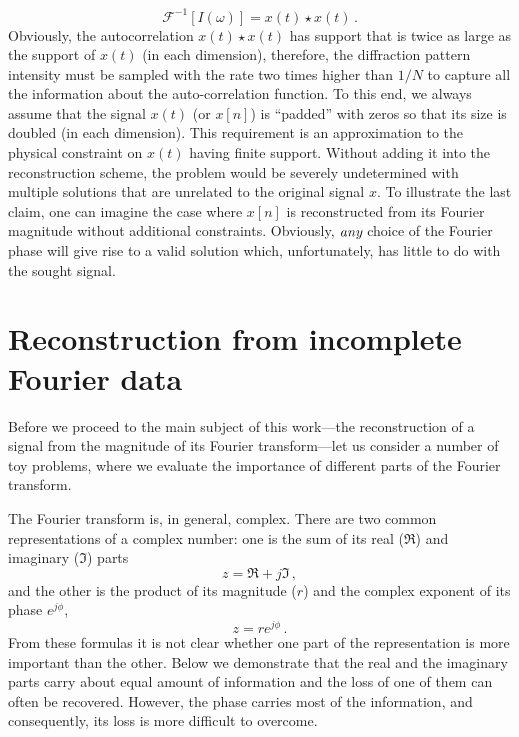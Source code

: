 \begin{equation}
  \label{eq:intro-2}
  \mathcal{F}^{-1}[I(\omega)] = x(t)\star x(t) \,. 
\end{equation}
Obviously, the autocorrelation $x(t)\star x(t)$ has support that is
twice as large as the support of $x(t)$ (in each dimension),
therefore, the diffraction pattern intensity must be sampled with the
rate two times higher than $1/N$ to capture all the information about
the auto-correlation function. To this end, we always assume that the
signal $x(t)$ (or $x[n]$) is ``padded'' with zeros so that its
size is doubled (in each dimension). This requirement is an
approximation to the physical constraint on $x(t)$ having finite
support. Without adding it into the reconstruction scheme, the problem
would be severely undetermined with multiple solutions that are
unrelated to the original signal $x$. To illustrate the last claim, one
can imagine the case where $x[n]$ is reconstructed from its Fourier
magnitude without additional constraints. Obviously, $\emph{any}$
choice of the Fourier phase will give rise to a valid solution which,
unfortunately,  has little to do  with the sought signal. 

\section{Reconstruction from incomplete Fourier data}
\label{sec:reconstr-from-incomp}
Before we proceed to the main subject of this work---the
reconstruction of a signal from the magnitude of its Fourier
transform---let us consider a number of toy problems, where we
evaluate the importance of different parts of the Fourier transform.

The Fourier transform is, in general, complex. There are two common
representations of a complex number: one is the sum of its real
($\Re$) and
imaginary ($\Im$) parts
\begin{equation}
  \label{eq:intro-3}
  z = \Re + j\Im \,, 
\end{equation}
and the other is the product of its magnitude ($r$) and the complex
exponent of its phase $e^{j\phi}$, 
\begin{equation}
  \label{eq:intro-4}
  z = re^{j\phi} \,. 
\end{equation}
From these formulas it is not clear whether one part of the
representation is more important
than the other. Below we demonstrate that the real and the
imaginary parts carry about equal amount of information and the loss
of one of them can often be recovered. However, the  phase carries
most of the information, and consequently, its loss is more difficult to
overcome. 

